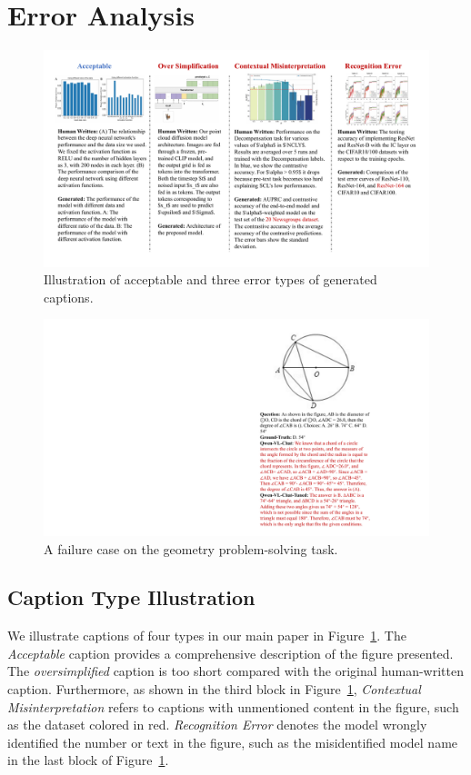 \section{Error Analysis}
\label{apx:case}
\begin{figure}[t!]
    \centering
    \includegraphics[width=0.95\linewidth]{figs/caption_error_type.pdf}
    \caption{Illustration of acceptable and three error types of generated captions.}
    \label{fig:caption_type}
\end{figure}


\begin{figure}[t!]
    \centering
    \includegraphics[width=0.85\linewidth]{figs/mathvista_both_wrong.pdf}
    \caption{A failure case on the geometry problem-solving task.}
\label{fig:geometry_fail}
\end{figure}
\subsection{Caption Type Illustration} 
\label{apx:caption_type}
We illustrate captions of four types in our main paper in Figure~\ref{fig:caption_type}. The \emph{Acceptable} caption provides a comprehensive description of the figure presented. The \emph{oversimplified} caption is too short compared with the original human-written caption. 
Furthermore, as shown in the third block in Figure~\ref{fig:caption_type}, \emph{Contextual Misinterpretation} refers to captions with unmentioned content in the figure, such as the dataset colored in red.
\emph{Recognition Error} denotes the model wrongly identified the number or text in the figure, such as the misidentified model name in the last block of Figure~\ref{fig:caption_type}.

